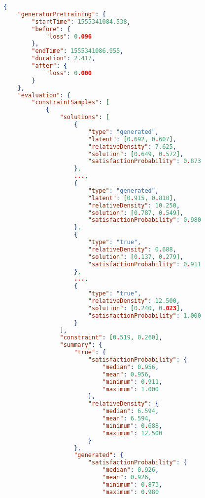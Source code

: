 \documentclass[../main.tex]{subfiles}
\begin{document}
\begin{lstlisting}[language=json,firstnumber=1,caption={The output of a typical experiment, automatically logged when the experiment concludes.},captionpos=b]
{  
    "generatorPretraining": {  
        "startTime": 1555341084.538,
        "before": {  
            "loss": 0.096
        },
        "endTime": 1555341086.955,
        "duration": 2.417,
        "after": {  
            "loss": 0.000
        }
    },
    "evaluation": {  
        "constraintSamples": [  
            {  
                "solutions": [  
                    {  
                        "type": "generated",
                        "latent": [0.692, 0.607],
                        "relativeDensity": 7.625,
                        "solution": [0.649, 0.572],
                        "satisfactionProbability": 0.873
                    },
                    ...,
                    {  
                        "type": "generated",
                        "latent": [0.915, 0.810],
                        "relativeDensity": 10.250,
                        "solution": [0.787, 0.549],
                        "satisfactionProbability": 0.980
                    },
                    {  
                        "type": "true",
                        "relativeDensity": 0.688,
                        "solution": [0.137, 0.279],
                        "satisfactionProbability": 0.911
                    },
                    ...,
                    {  
                        "type": "true",
                        "relativeDensity": 12.500,
                        "solution": [0.240, 0.023],
                        "satisfactionProbability": 1.000
                    }
                ],
                "constraint": [0.519, 0.260],
                "summary": {  
                    "true": {  
                        "satisfactionProbability": {  
                            "median": 0.956,
                            "mean": 0.956,
                            "minimum": 0.911,
                            "maximum": 1.000
                        },
                        "relativeDensity": {  
                            "median": 6.594,
                            "mean": 6.594,
                            "minimum": 0.688,
                            "maximum": 12.500
                        }
                    },
                    "generated": {  
                        "satisfactionProbability": {  
                            "median": 0.926,
                            "mean": 0.926,
                            "minimum": 0.873,
                            "maximum": 0.980

\end{lstlisting}
\end{document}
